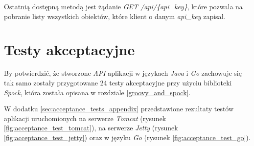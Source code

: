 Ostatnią dostępną metodą jest żądanie \textsl{GET /api/\{api\_key\}}, które pozwala na pobranie listy wszystkich obiektów, które klient o danym \textsl{api\_key} zapisał.

\section{Testy akceptacyjne} 

By potwierdzić, że stworzone \textsl{API} aplikacji w językach \textsl{Java} i \textsl{Go}  zachowuje się tak samo zostały przygotowane 24 testy akceptacyjne przy użyciu biblioteki \textsl{Spock}, która została opisana w rozdziale \ref{groovy_and_spock}.

W dodatku \ref{sec:acceptance_tests_appendix}  przedstawione rezultaty testów aplikacji uruchomionych na serwerze \textsl{Tomcat} (rysunek \ref{fig:acceptance_test_tomcat}), na serwerze \textsl{Jetty} (rysunek \ref{fig:acceptance_test_jetty}) oraz w języku \textsl{Go} (rysunek \ref{fig:acceptance_test_go}).


